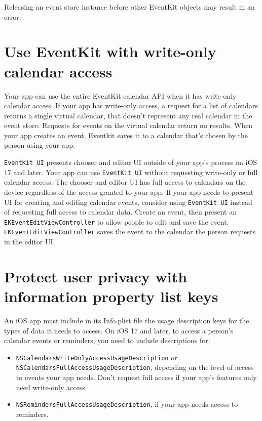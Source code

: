 \documentclass{article}
\begin{document}
Releasing an event store instance before other EventKit objects may result in an error.

\section*{Use EventKit with write-only calendar access}

Your app can use the entire EventKit calendar API when it has write-only calendar access. If your app has write-only access, a request for a list of calendars returns a single virtual calendar, that doesn't represent any real calendar in the event store. Requests for events on the virtual calendar return no results. When your app creates an event, Eventkit saves it to a calendar that's chosen by the person using your app.

\texttt{EventKit UI} presents chooser and editor UI outside of your app's process on iOS 17 and later. Your app can use \texttt{EventKit UI} without requesting write-only or full calendar access. The chooser and editor UI has full access to calendars on the device regardless of the access granted to your app. If your app needs to present UI for creating and editing calendar events, consider using \texttt{EventKit UI} instead of requesting full access to calendar data. Create an event, then present an \texttt{EKEventEditViewController} to allow people to edit and save the event. \texttt{EKEventEditViewController} saves the event to the calendar the person requests in the editor UI.

\section*{Protect user privacy with information property list keys}

An iOS app must include in its Info.plist file the usage description keys for the types of data it needs to access. On iOS 17 and later, to access a person's calendar events or reminders, you need to include descriptions for:

\begin{itemize}
    \item \texttt{NSCalendarsWriteOnlyAccessUsageDescription} or \texttt{NSCalendarsFullAccessUsageDescription}, depending on the level of access to events your app needs. Don't request full access if your app's features only need write-only access.
    \item \texttt{NSRemindersFullAccessUsageDescription}, if your app needs access to reminders.
\end{itemize}
\end{document}
